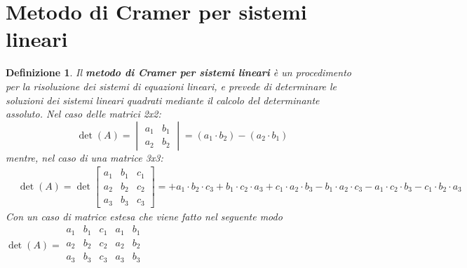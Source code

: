 \documentclass{article}
\newtheorem{defi}{Definizione}[section]
\begin{document}
\section{Metodo di Cramer per sistemi lineari}
\label{sec:Metododicramer}
\begin{defi}
  Il \textbf{metodo di Cramer per sistemi lineari} è un procedimento per la
  risoluzione dei sistemi di equazioni lineari, e prevede di determinare le
  soluzioni dei sistemi lineari quadrati mediante il calcolo del determinante
  assoluto. Nel caso delle matrici 2x2:
  \begin{equation}
    \label{eq:MotododiCrmer}
    \det(A)=
    \begin{vmatrix}
      a_1 & b_1\\
      a_2 & b_2
    \end{vmatrix} = (a_1\cdot b_2) - (a_2 \cdot b_1)
  \end{equation}
  mentre, nel caso di una matrice 3x3:
  \begin{align}&\det(A) = \det\begin{bmatrix}a_1 & b_1 & c_1 \\ a_2 & b_2 & c_2 \\ a_3 & b_3 &
c_3\end{bmatrix}={+a_1\cdot b_2\cdot c_3+ b_1 \cdot c_2 \cdot a_3 + c_1 \cdot a_2
                  \cdot b_3 - b_1 \cdot a_2 \cdot c_3 - a_1 \cdot c_2 \cdot b_3 - c_1\cdot b_2 \cdot a_3}
  \end{align}
  Con un caso di matrice estesa che viene fatto nel seguente modo $
  \det(A)=\begin{array}{|ccc|cc} 
    a_1&b_1&c_1&a_1&b_1\\ 
    a_2&b_2&c_2&a_2&b_2\\
    a_3&b_3&c_3&a_3&b_3\\
  \end{array}
  $
\end{defi}
\end{document}
